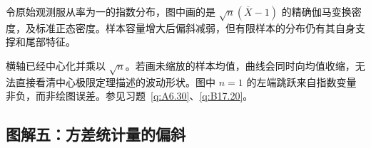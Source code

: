 \documentclass[UTF8,12pt,a4paper,fontset=fandol]{ctexbook}
\begin{document}
令原始观测服从率为一的指数分布，图中画的是 $\sqrt n(\overline X-1)$ 的精确伽马变换密度，及标准正态密度。样本容量增大后偏斜减弱，但有限样本的分布仍有其自身支撑和尾部特征。

横轴已经中心化并乘以 $\sqrt n$。若画未缩放的样本均值，曲线会同时向均值收缩，无法直接看清中心极限定理描述的波动形状。图中 $n=1$ 的左端跳跃来自指数变量非负，而非绘图误差。参见习题~\ref{q:A6.30}、\ref{q:B17.20}。

\clearpage\subsection*{图解五：方差统计量的偏斜}

\begin{center}%
\end{center}
\end{document}
